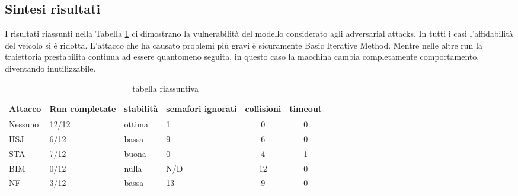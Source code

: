 \subsection{Sintesi risultati}
I risultati riassunti nella Tabella \ref{tab:ria} ci dimostrano la vulnerabilità del modello considerato agli adversarial attacks. In tutti i casi l'affidabilità del veicolo si è ridotta.
L'attacco che ha causato problemi più gravi è sicuramente Basic Iterative Method. Mentre nelle altre run la traiettoria prestabilita continua ad essere quantomeno seguita, in questo
caso la macchina cambia completamente comportamento, diventando inutilizzabile.
\begin{table}[h]
    \begin{tabular}{|p{1.5cm}|p{2.5cm}|p{2cm}|p{1.5cm}|c|c|}
        \hline
        Attacco        &   Run completate     &   stabilità     &  semafori ignorati        & collisioni & timeout\\
        \hline
        Nessuno       &  12/12               &    ottima         &  1                        & 0 & 0 \\
        HSJ            &  6/12                &   bassa         &  9                        & 6  & 0 \\
        STA            &  7/12                &   buona         &  0                        & 4  & 1 \\
        BIM            &  0/12                &   nulla         &  N/D                      & 12 & 0\\
        NF             &  3/12                &   bassa         &   13                      & 9  & 0 \\
        \hline
    \end{tabular}
    \caption{tabella riassuntiva}
    \label{tab:ria}
\end{table}
